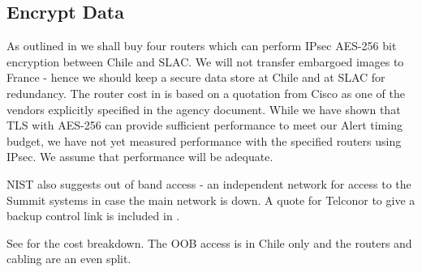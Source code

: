 \subsection{Encrypt Data} \label{sec:1encrypt}

As outlined in   we shall buy four routers which can perform IPsec AES-256 bit encryption between Chile and SLAC.
We will not transfer embargoed images to France - hence we should keep a secure data store at Chile and at SLAC for redundancy.
The router cost in   is based on a quotation from Cisco as one of the vendors explicitly specified in the agency document.
While we have shown that TLS with AES-256 can provide sufficient performance to meet our Alert timing budget, we have not yet measured performance with the specified routers using IPsec.
We assume that performance will be adequate.

NIST also suggests out of band access - an independent network for access to the Summit systems in case the main network is down.
A quote for Telconor to give a backup control link is included in .

See  for the cost breakdown.  The OOB access is in Chile only and the routers and cabling are an even split.



